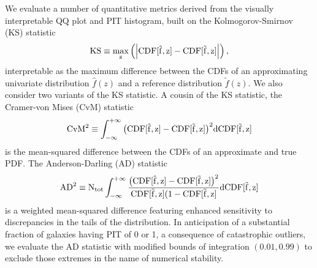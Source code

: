 We evaluate a number of quantitative metrics derived from the visually interpretable QQ plot and PIT histogram, built on the Kolmogorov-Smirnov (KS) statistic
\begin{equation}
\eqlabel{eq:ks}
\rm{KS} \equiv \max_{z} \left( \left| \rm{CDF}[\hat{f}, z] - \rm{CDF}[\tilde{f}, z] \right| \right),
\end{equation}
interpretable as the maximum difference between the CDFs of an approximating univariate distribution $\hat{f}(z)$ and a reference distribution $\tilde{f}(z)$.
We also consider two variants of the KS statistic.
A cousin of the KS statistic, the Cramer-von Mises (CvM) statistic
\begin{equation}
\eqlabel{eq:cvm}
\rm{CvM}^{2} \equiv \int_{-\infty}^{+\infty} \big(\rm{CDF}[\hat{f}, z] - \rm{CDF}[\tilde{f}, z]\big)^2 \mathrm{d}\rm{CDF}[\tilde{f}, z]
\end{equation}
is the mean-squared difference between the CDFs of an approximate and true PDF.
The Anderson-Darling (AD) statistic
\begin{equation} \eqlabel{eq:ad}
\rm{AD}^2 \equiv N_{tot}\int_{-\infty}^{+\infty} \frac{\big(\rm{CDF}[\hat{f}, z] - \rm{CDF}[\tilde{f}, z]\big)^2} {\rm{CDF}[\tilde{f}, z] (1 -\rm{CDF}[\tilde{f}, z]} \mathrm{d}\rm{CDF}[\tilde{f}, z]
\end{equation}
is a weighted mean-squared difference featuring enhanced sensitivity to discrepancies in the tails of the distribution.
In anticipation of a substantial fraction of galaxies having PIT of 0 or 1, a consequence of catastrophic outliers, we evaluate the AD statistic with modified bounds of integration $(0.01, 0.99)$ to exclude those extremes in the name of numerical stability.

